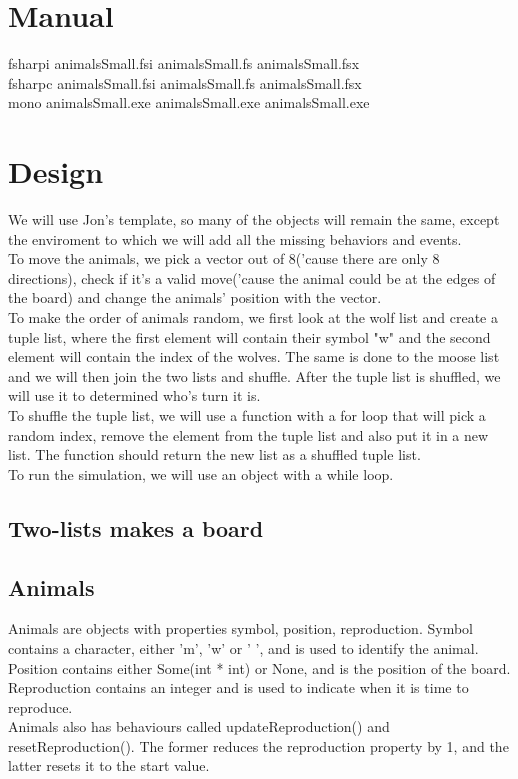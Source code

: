 \documentclass{article}
\begin{document}
    \section{Manual}
   		fsharpi animalsSmall.fsi animalsSmall.fs animalsSmall.fsx
   		\\
   		fsharpc animalsSmall.fsi animalsSmall.fs animalsSmall.fsx
    	\\
    	mono animalsSmall.exe animalsSmall.exe animalsSmall.exe
    \section{Design}
    	We will use Jon's template, so many of the objects will remain the same, except the enviroment to which we will add all the missing behaviors and events.
    	\\
    	To move the animals, we pick a vector out of 8('cause there are only 8 directions), check if it's a valid move('cause  the animal could be at the edges of the board) and change the animals' position with the vector.
    	\\
    	To make the order of animals random, we first look at the wolf list and create a tuple list, where the first element will contain their symbol "w" and the second element will contain the index of the wolves. The same is done to the moose list and we will then join the two lists and shuffle. After the tuple list is shuffled, we will use it to determined who's turn it is.
    	\\
    	To shuffle the tuple list, we will use a function with a for loop that will pick a random index, remove the element from the tuple list and also put it in a new list. The function should return the new list as a shuffled tuple list.
    	\\
    	To run the simulation, we will use an object with a while loop.
    \subsection{Two-lists makes a board}
    \subsection{Animals}
    	Animals are objects with properties symbol, position, reproduction. Symbol contains a character, either 'm', 'w' or ' ', and is used to identify the animal. Position contains either Some(int * int) or None, and is the position of the board. Reproduction contains an integer and is used to indicate when it is time to reproduce.
    	\\
    	Animals also has behaviours called updateReproduction() and resetReproduction(). The former reduces the reproduction property by 1, and the latter resets it to the start value.
\end{document}
